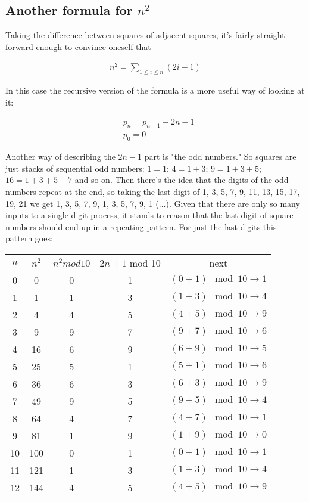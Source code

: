 \subsection{Another formula for $n^2$}

Taking the difference between squares of adjacent squares, it's fairly straight forward enough to convince
oneself that

\begin{align*}
     n^2 = \sum_{1 \leq i \leq n} (2i - 1)
\end{align*}

In this case the recursive version of the formula is a more useful way of looking at it:

\begin{align*}
     &p_n = p_{n - 1} + 2n - 1 \\
     &p_0 = 0
\end{align*}

Another way of describing the $2n - 1$ part is "the odd numbers."  So squares are just stacks of sequential odd numbers:
$1 = 1$; $4 = 1 + 3$; $9 = 1 + 3 + 5$; $16 = 1 + 3 + 5 + 7$ and so on.  Then there's the idea that the digits of the odd
numbers repeat at the end, so taking the last digit of 1, 3, 5, 7, 9, 11, 13, 15, 17, 19, 21 we get 1, 3, 5, 7, 9,
1, 3, 5, 7, 9, 1 (...).  Given that there are only so many inputs to a single digit process, it stands to reason that the
last digit of square numbers should end up in a repeating pattern.  For just the last digits this pattern goes:

\begin{center}
\begin{tabular}{ c c c c c }
$n$ & $n^2$ & $n^2 mod 10$ & $2n + 1$ mod 10 & next \\ 
0 & 0 & 0 & 1 & $(0 + 1) \mod 10 \rightarrow 1$ \\  
1 & 1 & 1 & 3 & $(1 + 3) \mod 10 \rightarrow 4$ \\  
2 & 4 & 4 & 5 & $(4 + 5) \mod 10 \rightarrow 9$ \\
3 & 9 & 9 & 7 & $(9 + 7) \mod 10 \rightarrow 6$ \\
4 & 16 & 6 & 9 & $(6 + 9) \mod 10 \rightarrow 5$ \\
5 & 25 & 5 & 1 & $(5 + 1) \mod 10 \rightarrow 6$ \\
6 & 36 & 6 & 3 & $(6 + 3) \mod 10 \rightarrow 9$ \\
7 & 49 & 9 & 5 & $(9 + 5) \mod 10 \rightarrow 4$ \\
8 & 64 & 4 & 7 & $(4 + 7) \mod 10 \rightarrow 1$ \\
9 & 81 & 1 & 9 & $(1 + 9) \mod 10 \rightarrow 0$ \\
10 & 100 & 0 & 1 & $(0 + 1) \mod 10 \rightarrow 1$ \\
11 & 121 & 1 & 3 & $(1 + 3) \mod 10 \rightarrow 4$ \\
12 & 144 & 4 & 5 & $(4 + 5) \mod 10 \rightarrow 9$  
\end{tabular}
\end{center}

